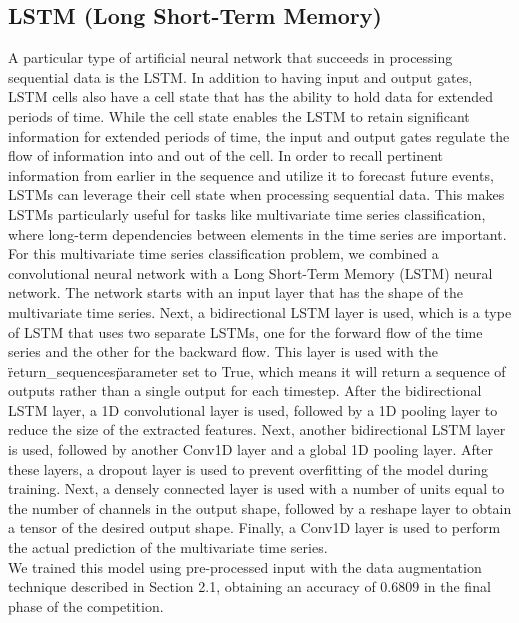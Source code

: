 \documentclass[11pt, oneside]{article}
\begin{document}
\subsection{LSTM (Long Short-Term Memory)}
A particular type of artificial neural network that succeeds in processing sequential data is the LSTM. In addition to having input and output gates, LSTM cells also have a cell state that has the ability to hold data for extended periods of time. While the cell state enables the LSTM to retain significant information for extended periods of time, the input and output gates regulate the flow of information into and out of the cell. In order to recall pertinent information from earlier in the sequence and utilize it to forecast future events, LSTMs can leverage their cell state when processing sequential data. This makes LSTMs particularly useful for tasks like multivariate time series classification, where long-term dependencies between elements in the time series are important.\\
For this multivariate time series classification problem, we combined a convolutional neural network with a Long Short-Term Memory (LSTM) neural network.
The network starts with an input layer that has the shape of the multivariate time series. Next, a bidirectional LSTM layer is used, which is a type of LSTM that uses two separate LSTMs, one for the forward flow of the time series and the other for the backward flow. This layer is used with the \"return\_sequences\" parameter set to True, which means it will return a sequence of outputs rather than a single output for each timestep.
After the bidirectional LSTM layer, a 1D convolutional layer is used, followed by a 1D pooling layer to reduce the size of the extracted features. Next, another bidirectional LSTM layer is used, followed by another Conv1D layer and a global 1D pooling layer.
After these layers, a dropout layer is used to prevent overfitting of the model during training. Next, a densely connected layer is used with a number of units equal to the number of channels in the output shape, followed by a reshape layer to obtain a tensor of the desired output shape. Finally, a Conv1D layer is used to perform the actual prediction of the multivariate time series.\\
We trained this model using pre-processed input with the data augmentation technique described in Section 2.1, obtaining an accuracy of 0.6809 in the final phase of the competition.
\end{document}
